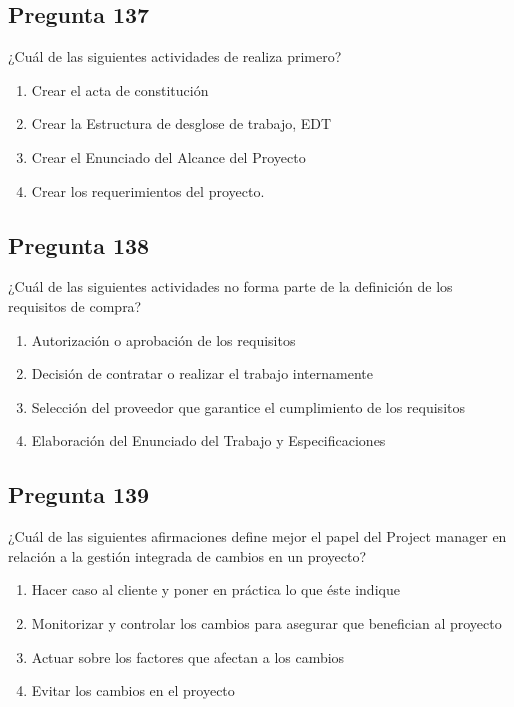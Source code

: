 \documentclass[11pt,a4paper]{article}
\begin{document}
\subsection*{Pregunta 137}
¿Cuál de las siguientes actividades de realiza primero?

\begin{enumerate}[label=\alph*)]
  \item Crear el acta de constitución
  \item Crear la Estructura de desglose de trabajo, EDT
  \item Crear el Enunciado del Alcance del Proyecto
  \item Crear los requerimientos del proyecto.
\end{enumerate}

\subsection*{Pregunta 138}
¿Cuál de las siguientes actividades no forma parte de la definición de los requisitos de compra?

\begin{enumerate}[label=\alph*)]
  \item Autorización o aprobación de los requisitos
  \item Decisión de contratar o realizar el trabajo internamente
  \item Selección del proveedor que garantice el cumplimiento de los requisitos
  \item Elaboración del Enunciado del Trabajo y Especificaciones
\end{enumerate}

\subsection*{Pregunta 139}
¿Cuál de las siguientes afirmaciones define mejor el papel del Project manager en relación a la gestión integrada de cambios en un proyecto?

\begin{enumerate}[label=\alph*)]
  \item Hacer caso al cliente y poner en práctica lo que éste indique
  \item Monitorizar y controlar los cambios para asegurar que benefician al proyecto
  \item Actuar sobre los factores que afectan a los cambios
  \item Evitar los cambios en el proyecto
\end{enumerate}
\end{document}
